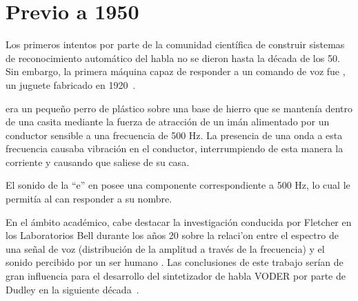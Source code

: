 \section{Previo a 1950}
\label{sec:pre50s}

Los primeros intentos por parte de la comunidad cient\'{i}fica de construir sistemas de 
reconocimiento autom\'{a}tico del habla no se dieron hasta la d\'{e}cada de los 50. 
Sin embargo, la primera m\'{a}quina capaz de responder a un comando de voz fue , 
un juguete fabricado en \mbox{1920 \cite{AnusuyaSpeech2009}}.

 era un peque\~{n}o perro de pl\'{a}stico sobre una base de hierro que se manten\'{i}a 
dentro de una casita mediante la fuerza de atracci\'{o}n de un im\'{a}n alimentado por un conductor
sensible a una frecuencia de 500 Hz.
La presencia de una onda a esta frecuencia causaba vibraci\'{o}n en el conductor, interrumpiendo de
esta manera la corriente y causando que  saliese de su casa. 

El sonido de la ``e'' en  posee una componente correspondiente a 500 Hz, lo cual le 
permit\'{i}a al can responder a su nombre.

En el \'{a}mbito acad\'{e}mico, cabe destacar la investigaci\'{o}n conducida por Fletcher en 
los Laboratorios Bell durante los a\~{n}os 20 sobre la relaci'{o}n entre el espectro de una se\~{n}al 
de voz (distribuci\'{o}n de la amplitud a trav\'{e}s de la frecuencia) y el sonido percibido 
por un ser humano \cite{FletcherNature1922}. 
Las conclusiones de este trabajo ser\'{i}an de gran influencia para el desarrollo del sintetizador de
habla VODER por parte de Dudley en la siguiente \mbox{d\'{e}cada \cite{JuangAutomaticSpeech}}. 
